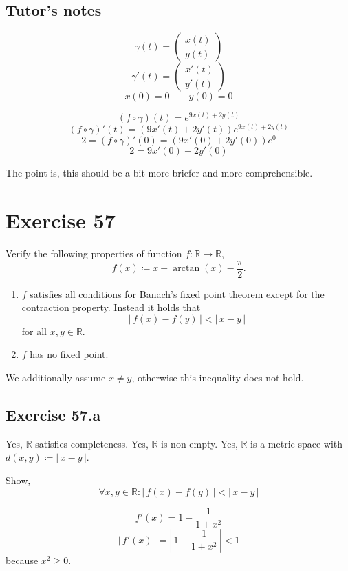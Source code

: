 \documentclass[a4paper]{article}
\theoremstyle{definition}
\newcommand\abs[1]{\left|\,#1\,\right|}
\begin{document}
\subsection{Tutor's notes}
\[ \gamma(t) = \begin{pmatrix} x(t) \\ y(t) \end{pmatrix} \]
\[ \gamma'(t) = \begin{pmatrix} x'(t) \\ y'(t) \end{pmatrix} \]
\[ x(0) = 0 \qquad y(0) = 0 \]

\[ (f \circ \gamma)(t) = e^{9x(t) + 2y(t)} \]
\[ (f \circ \gamma)'(t) = (9x'(t) + 2y'(t)) e^{9x(t) + 2y(t)} \]
\[ 2 = (f \circ \gamma)'(0) = (9x'(0) + 2y'(0)) e^0 \]
\[ 2 = 9x'(0) + 2y'(0) \]

The point is, this should be a bit more briefer and more comprehensible.

\section{Exercise 57}
\begin{ex}
  Verify the following properties of function $f: \mathbb R \to \mathbb R$,
  \[ f(x) \coloneqq x - \arctan(x) - \frac{\pi}{2}. \]
  \begin{enumerate}
    \item $f$ satisfies all conditions for Banach's fixed point theorem
      except for the contraction property. Instead it holds that
      \[ \abs{f(x) - f(y)} < \abs{x - y} \]
      for all $x, y \in \mathbb R$.
    \item $f$ has no fixed point.
  \end{enumerate}
\end{ex}

We additionally assume $x \neq y$, otherwise this inequality does not hold.

\subsection{Exercise 57.a}
Yes, $\mathbb R$ satisfies completeness.
Yes, $\mathbb R$ is non-empty.
Yes, $\mathbb R$ is a metric space with $d(x, y) \coloneqq \abs{x - y}$.

Show,
\[ \forall x, y \in \mathbb R: \abs{f(x) - f(y)} < \abs{x - y} \]

\[ f'(x) = 1 - \frac{1}{1 + x^2} \]
\[ \abs{f'(x)} = \abs{1 - \frac{1}{1 + x^2}} < 1 \]
because $x^2 \geq 0$.
\end{document}
